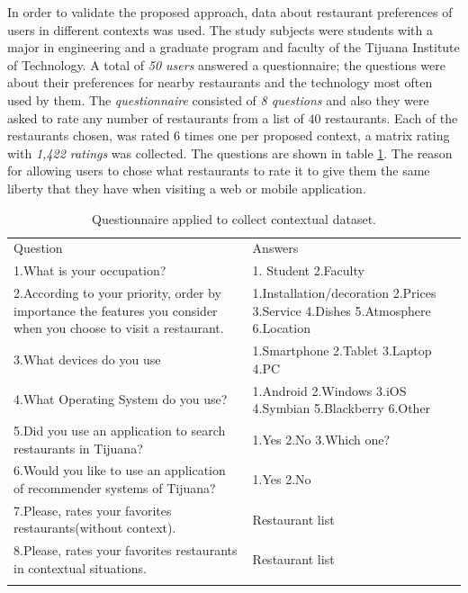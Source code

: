 In order to validate the proposed approach,  data  about 
restaurant preferences of users in different contexts was used.
The study subjects were students  with a major in engineering and  
a graduate program and faculty of the Tijuana Institute of
Technology. A total of \textit{50 users} answered a questionnaire; the
questions were about their preferences for nearby restaurants and the
technology most often used by them. The \textit{questionnaire} consisted 
of \textit{8 questions} and also they were asked to rate any number 
of restaurants from a list of 40 restaurants.
Each of the restaurants chosen, was rated 6 times one per proposed 
context, a matrix rating with \textit{1,422 ratings} was collected. The
questions are shown in table \ref{tab:questions}. The reason for allowing
users to chose what restaurants to rate it to give them the same liberty
that they have when visiting a web or mobile application. 
\begin{table}
\small
\captionsetup{font=footnotesize}
\caption{Questionnaire applied to collect contextual dataset.}
\label{tab:questions} 
\centering
\small
\begin{tabular}{p{7cm} p{5cm} }
\hline\noalign{\smallskip}
Question & Answers \\
\noalign{\smallskip}\hline\noalign{\smallskip}
\small{1.What is your occupation?} & \small{1. Student 2.Faculty} \\ \hline  
\small{2.According to your priority, order by importance the features 
you consider when you choose to visit a restaurant.} & 
\small{1.Installation/decoration 2.Prices 3.Service 4.Dishes
5.Atmosphere 6.Location} \\ \hline  
\small{3.What devices do you use} &
\small{1.Smartphone 2.Tablet 3.Laptop 4.PC} \\ \hline   
\small{4.What Operating System do you use?} & 
\small{1.Android 2.Windows 3.iOS 4.Symbian 5.Blackberry 6.Other}
\\ \hline  
\small{5.Did you use an application to search restaurants in Tijuana?} &
\small{1.Yes 2.No 3.Which one?} \\ \hline   
\small{6.Would you like to use an application of
recommender systems of Tijuana?} & \small{1.Yes 2.No} \\ \hline  
\small{7.Please, rates your favorites restaurants(without context).} & 
\small{Restaurant list} \\ \hline
\small{8.Please, rates your favorites restaurants in contextual situations.} & 
\small{Restaurant list} \\
\noalign{\smallskip}\hline
\end{tabular}
\end{table}
